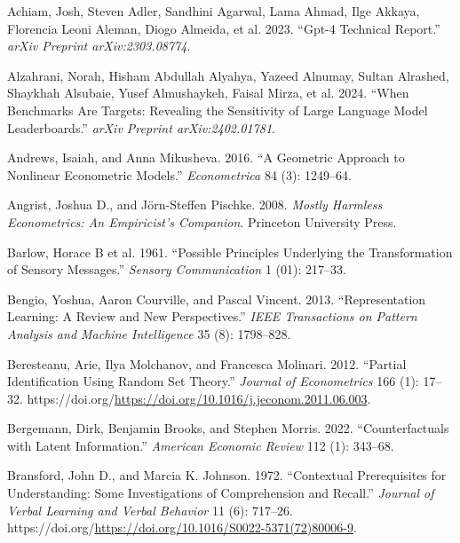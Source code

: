 \documentclass[
]{article}
\newlength{\cslhangindent}
\newenvironment{CSLReferences}[2] %
 {\begin{list}{}{%
  \setlength{\itemindent}{0pt}
  \setlength{\leftmargin}{0pt}
  \setlength{\parsep}{0pt}
  \ifodd #1
   \setlength{\leftmargin}{\cslhangindent}
   \setlength{\itemindent}{-1\cslhangindent}
  \fi
  \setlength{\itemsep}{#2\baselineskip}}}
 {\end{list}}
\begin{document}
\label{refs}
\begin{CSLReferences}{1}{0}
Achiam, Josh, Steven Adler, Sandhini Agarwal, Lama Ahmad, Ilge Akkaya,
Florencia Leoni Aleman, Diogo Almeida, et al. 2023. {``Gpt-4 Technical
Report.''} \emph{arXiv Preprint arXiv:2303.08774}.

Alzahrani, Norah, Hisham Abdullah Alyahya, Yazeed Alnumay, Sultan
Alrashed, Shaykhah Alsubaie, Yusef Almushaykeh, Faisal Mirza, et al.
2024. {``When Benchmarks Are Targets: Revealing the Sensitivity of Large
Language Model Leaderboards.''} \emph{arXiv Preprint arXiv:2402.01781}.

Andrews, Isaiah, and Anna Mikusheva. 2016. {``A Geometric Approach to
Nonlinear Econometric Models.''} \emph{Econometrica} 84 (3): 1249--64.

Angrist, Joshua D., and Jörn-Steffen Pischke. 2008. \emph{Mostly
Harmless Econometrics: An Empiricist's Companion}. Princeton University
Press.

Barlow, Horace B et al. 1961. {``Possible Principles Underlying the
Transformation of Sensory Messages.''} \emph{Sensory Communication} 1
(01): 217--33.

Bengio, Yoshua, Aaron Courville, and Pascal Vincent. 2013.
{``Representation Learning: A Review and New Perspectives.''} \emph{IEEE
Transactions on Pattern Analysis and Machine Intelligence} 35 (8):
1798--828.

Beresteanu, Arie, Ilya Molchanov, and Francesca Molinari. 2012.
{``Partial Identification Using Random Set Theory.''} \emph{Journal of
Econometrics} 166 (1): 17--32.
https://doi.org/\url{https://doi.org/10.1016/j.jeconom.2011.06.003}.

Bergemann, Dirk, Benjamin Brooks, and Stephen Morris. 2022.
{``Counterfactuals with Latent Information.''} \emph{American Economic
Review} 112 (1): 343--68.

Bransford, John D., and Marcia K. Johnson. 1972. {``Contextual
Prerequisites for Understanding: Some Investigations of Comprehension
and Recall.''} \emph{Journal of Verbal Learning and Verbal Behavior} 11
(6): 717--26.
https://doi.org/\url{https://doi.org/10.1016/S0022-5371(72)80006-9}.


\end{CSLReferences}
\end{document}
